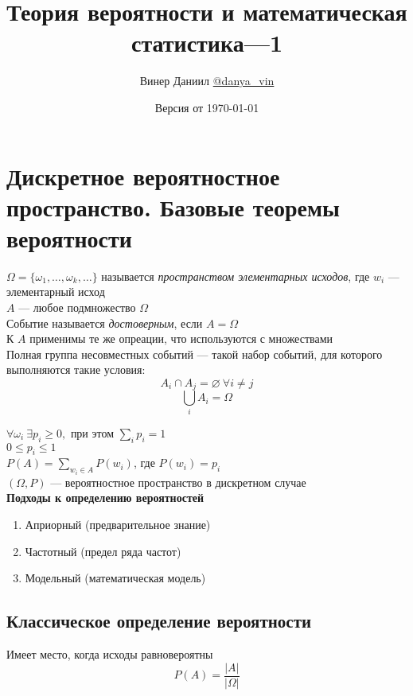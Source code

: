 \documentclass[a4paper, 10pt]{article}
\title{\LARGE{Теория вероятности и математическая статистика—1}}
\author{Винер Даниил  \href{https://t.me/danya_vin}{@danya\_vin}}
\date{Версия от \today}
\begin{document}
\maketitle
\tableofcontents
\setlength{\parindent}{15pt}
\setlength{\parskip}{2mm}
\newpage
\section{Дискретное вероятностное пространство. Базовые теоремы вероятности}
 $\Omega=\{\omega_1,\ldots,\omega_k,\ldots\}$ называется \textit{пространством элементарных исходов}, где $w_i$ — элементарный исход\\[2mm]
 $A$ — любое подмножество $\Omega$\\[2mm]
 Событие называется \textit{достоверным}, если $A=\Omega$\\[2mm]
\comment К $A$ применимы те же опреации, что используются с множествами\\[2mm]
 Полная группа несовместных событий — такой набор событий, для которого выполняются такие условия:
\begin{equation*}
    A_i\cap A_j=\varnothing\ \forall i\ne j
\end{equation*}
\begin{equation*}
    \displaystyle\bigcup\limits_i A_i=\Omega
\end{equation*}

\axiom $\forall \omega_i\ \exists p_i\geqslant0,$ при этом $\displaystyle\sum_i p_i=1$\\[2mm]
\corollary $0\leqslant p_i\leqslant1$\\[2mm]
 $P(A)=\sum_{w_i\in A} P(w_i)$, где $P(w_i)=p_i$\\[2mm]
\indent $(\Omega, P)$ — вероятностное пространство в дискретном случае\\[2mm]
\textbf{Подходы к определению вероятностей}
\begin{enumerate}
    \item Априорный (предварительное знание)
    \item Частотный (предел ряда частот)
    \item Модельный (математическая модель)
\end{enumerate}
\subsection{Классическое определение вероятности}
\indent Имеет место, когда исходы равновероятны\\[2mm]
$$P(A)=\displaystyle\frac{|A|}{|\Omega|}$$
\end{document}
